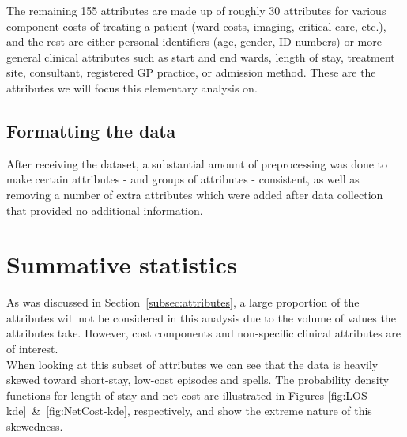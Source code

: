\documentclass{article}
\begin{document}
The remaining 155 attributes are made up of roughly 30 attributes for various
component costs of treating a patient (ward costs, imaging, critical care,
etc.), and the rest are either personal identifiers (age, gender, ID numbers) or
more general clinical attributes such as start and end wards, length of stay,
treatment site, consultant, registered GP practice, or admission method. These
are the attributes we will focus this elementary analysis on.


\subsection{Formatting the data}\label{subsec:formatting}

After receiving the dataset, a substantial amount of preprocessing was done to
make certain attributes - and groups of attributes - consistent, as well as
removing a number of extra attributes which were added after data collection
that provided no additional information.\\


\section{Summative statistics}\label{sec:summative}

As was discussed in Section~\ref{subsec:attributes}, a large proportion of the 
attributes will not be considered in this analysis due to the volume of values 
the attributes take. However, cost components and non-specific clinical 
attributes are of interest.\\

When looking at this subset of attributes we can see that the data is heavily 
skewed toward short-stay, low-cost episodes and spells. The probability
density functions for length of stay and net cost are illustrated in Figures 
\ref{fig:LOS-kde}~\&~\ref{fig:NetCost-kde}, respectively, and show the extreme
nature of this skewedness.\\
\end{document}
